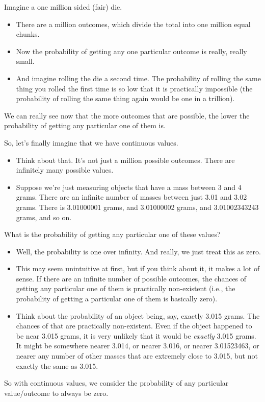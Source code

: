 \documentclass[../../../main.tex]{subfiles}
\begin{document}
Imagine a one million sided (fair) die.

\begin{itemize}
  \item There are a million outcomes, which divide the total into one million equal chunks.
  \item Now the probability of getting any one particular outcome is really, really small.
  \item And imagine rolling the die a second time. The probability of rolling the same thing you rolled the first time is so low that it is practically impossible (the probability of rolling the same thing again would be one in a trillion).
\end{itemize}

We can really see now that the more outcomes that are possible, the lower the probability of getting any particular one of them is.

So, let's finally imagine that we have continuous values. 

\begin{itemize}
  \item Think about that. It's not just a million possible outcomes. There are infinitely many possible values. 
  \item Suppose we're just measuring objects that have a mass between 3 and 4 grams. There are an infinite number of masses between just 3.01 and 3.02 grams. There is 3.01000001 grams, and 3.01000002 grams, and 3.01002343243 grams, and so on.
\end{itemize}

What is the probability of getting any particular one of these values? 

\begin{itemize}
  \item Well, the probability is one over infinity. And really, we just treat this as zero. 
  \item This may seem unintuitive at first, but if you think about it, it makes a lot of sense. If there are an infinite number of possible outcomes, the chances of getting any particular one of them is practically non-existent (i.e., the probability of getting a particular one of them is basically zero).
  \item Think about the probability of an object being, say, exactly 3.015 grams. The chances of that are practically non-existent. Even if the object happened to be near 3.015 grams, it is very unlikely that it would be \emph{exactly} 3.015 grams. It might be somewhere nearer 3.014, or nearer 3.016, or nearer 3.01523463, or nearer any number of other masses that are extremely close to 3.015, but not exactly the same as 3.015. 
\end{itemize}

So with continuous values, we consider the probability of any particular value/outcome to always be zero. 
\end{document}
